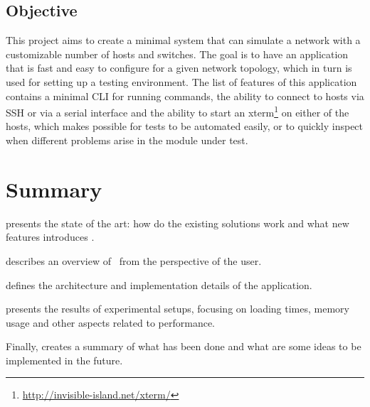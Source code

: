 \subsection{Objective}
\label{sub-sec:proj-desc-objective}

This project aims to create a minimal system that can simulate a network with a customizable number of hosts and switches.
The goal is to have an application that is fast and easy to configure for a given network topology, which in turn is used for setting up a testing environment.
The list of features of this application contains a minimal  CLI for running commands, the ability to connect to hosts via  SSH or via a serial interface and the ability to start an xterm\footnote{\url{http://invisible-island.net/xterm/}} on either of the hosts, which makes possible for tests to be automated easily, or to quickly inspect when different problems arise in the module under test.

\section{Summary}
\label{sec:summary}

 presents the state of the art: how do the existing solutions work and what new features introduces \project.

 describes an overview of \project\ from the perspective of the user.

 defines the architecture and implementation details of the application.

 presents the results of experimental setups, focusing on loading times, memory usage and other aspects related to performance.

Finally,  creates a summary of what has been done and what are some ideas to be implemented in the future.
